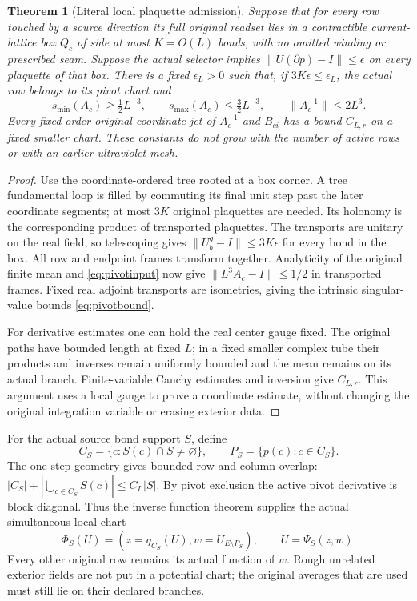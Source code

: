 \documentclass[11pt,letterpaper]{article}
\theoremstyle{plain}
\newtheorem{theorem}{Theorem}[section]
\theoremstyle{remark}\newtheorem{remark}[theorem]{Scope}
\begin{document}
\begin{theorem}[Literal local plaquette admission]
\label{thm:admission}
Suppose that for every row touched by a source direction its full original readset
lies in a contractible current-lattice box $Q_c$ of side at most $K=O(L)$ bonds,
with no omitted winding or prescribed seam. Suppose the actual selector implies
$\|U(\partial p)-I\|\le\epsilon$ on every plaquette of that box. There is a fixed
$\epsilon_L>0$ such that, if $3K\epsilon\le\epsilon_L$, the actual row belongs
to its pivot chart and
\begin{equation}
s_{\min}(A_c)\ge\tfrac12L^{-3},\qquad
s_{\max}(A_c)\le\tfrac32L^{-3},\qquad
\|A_c^{-1}\|\le2L^3.
\label{eq:pivotbound}
\end{equation}
Every fixed-order original-coordinate jet of $A_c^{-1}$ and $B_{ci}$ has a
bound $C_{L,r}$ on a fixed smaller chart. These constants do not grow with the
number of active rows or with an earlier ultraviolet mesh.
\end{theorem}
\begin{proof}
Use the coordinate-ordered tree rooted at a box corner. A tree fundamental loop
is filled by commuting its final unit step past the later coordinate segments;
at most $3K$ original plaquettes are needed. Its holonomy is the corresponding
product of transported plaquettes. The transports are unitary on the real field,
so telescoping gives $\|U_b^g-I\|\le3K\epsilon$ for every bond in the box.
All row and endpoint frames transform together. Analyticity of the original
finite mean and \eqref{eq:pivotinput} now give
$\|L^3A_c-I\|\le1/2$ in transported frames. Fixed real adjoint transports are
isometries, giving the intrinsic singular-value bounds \eqref{eq:pivotbound}.

For derivative estimates one can hold the real center gauge fixed. The original
paths have bounded length at fixed $L$; in a fixed smaller complex tube their
products and inverses remain uniformly bounded and the mean remains on its
actual branch. Finite-variable Cauchy estimates and inversion give $C_{L,r}$.
This argument uses a local gauge to prove a coordinate estimate, without changing
the original integration variable or erasing exterior data.
\end{proof}

For the actual source bond support $S$, define
\begin{equation}
C_S=\{c:S(c)\cap S\ne\varnothing\},\qquad P_S=\{p(c):c\in C_S\}.
\label{eq:activerows}
\end{equation}
The one-step geometry gives bounded row and column overlap:
$|C_S|+|\bigcup_{c\in C_S}S(c)|\le C_L|S|$. By pivot exclusion the active
pivot derivative is block diagonal. Thus the inverse function theorem supplies
the actual simultaneous local chart
\begin{equation}
\Phi_S(U)=(z=q_{C_S}(U),w=U_{E\setminus P_S}),\qquad U=\Psi_S(z,w).
\label{eq:partialchart}
\end{equation}
Every other original row remains its actual function of $w$. Rough unrelated
exterior fields are not put in a potential chart; the original averages that
are used must still lie on their declared branches.
\end{document}
